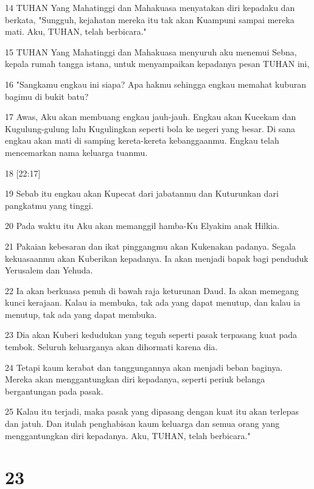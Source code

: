 \par 14 TUHAN Yang Mahatinggi dan Mahakuasa menyatakan diri kepadaku dan berkata, "Sungguh, kejahatan mereka itu tak akan Kuampuni sampai mereka mati. Aku, TUHAN, telah berbicara."
\par 15 TUHAN Yang Mahatinggi dan Mahakuasa menyuruh aku menemui Sebna, kepala rumah tangga istana, untuk menyampaikan kepadanya pesan TUHAN ini,
\par 16 "Sangkamu engkau ini siapa? Apa hakmu sehingga engkau memahat kuburan bagimu di bukit batu?
\par 17 Awas, Aku akan membuang engkau jauh-jauh. Engkau akan Kucekam dan Kugulung-gulung lalu Kugulingkan seperti bola ke negeri yang besar. Di sana engkau akan mati di samping kereta-kereta kebanggaanmu. Engkau telah mencemarkan nama keluarga tuanmu.
\par 18 [22:17]
\par 19 Sebab itu engkau akan Kupecat dari jabatanmu dan Kuturunkan dari pangkatmu yang tinggi.
\par 20 Pada waktu itu Aku akan memanggil hamba-Ku Elyakim anak Hilkia.
\par 21 Pakaian kebesaran dan ikat pinggangmu akan Kukenakan padanya. Segala kekuasaanmu akan Kuberikan kepadanya. Ia akan menjadi bapak bagi penduduk Yerusalem dan Yehuda.
\par 22 Ia akan berkuasa penuh di bawah raja keturunan Daud. Ia akan memegang kunci kerajaan. Kalau ia membuka, tak ada yang dapat menutup, dan kalau ia menutup, tak ada yang dapat membuka.
\par 23 Dia akan Kuberi kedudukan yang teguh seperti pasak terpasang kuat pada tembok. Seluruh keluarganya akan dihormati karena dia.
\par 24 Tetapi kaum kerabat dan tanggungannya akan menjadi beban baginya. Mereka akan menggantungkan diri kepadanya, seperti periuk belanga bergantungan pada pasak.
\par 25 Kalau itu terjadi, maka pasak yang dipasang dengan kuat itu akan terlepas dan jatuh. Dan itulah penghabisan kaum keluarga dan semua orang yang menggantungkan diri kepadanya. Aku, TUHAN, telah berbicara."

\chapter{23}


